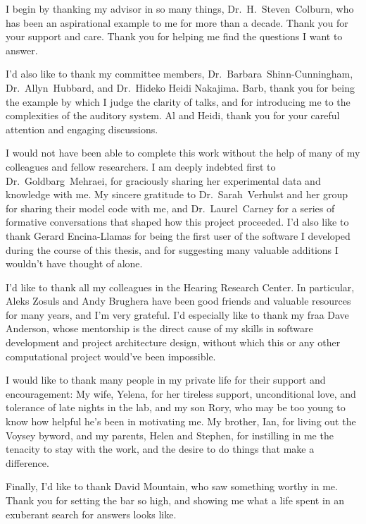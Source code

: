 
I begin by thanking my advisor in so many things, Dr.~H.~Steven~Colburn, who has been an aspirational example to me for more than a decade.  Thank you for  your support and care.  Thank you for helping me find the questions I want to answer.   

I'd also like to thank my committee members, Dr.~Barbara~Shinn-Cunningham, Dr.~Allyn~Hubbard, and Dr.~Hideko Heidi Nakajima.  Barb, thank you for being the example by which I judge the clarity of talks, and for introducing me to the complexities of the auditory system.  Al and Heidi, thank you for your careful attention and engaging discussions.

I would not have been able to complete this work without the help of many of my colleagues and fellow researchers.  I am deeply indebted first to Dr.~Goldbarg~Mehraei, for graciously sharing her experimental data and knowledge with me.  My sincere gratitude to Dr.~Sarah~Verhulst and her group for sharing their model code with me, and Dr.~Laurel~Carney for a series of formative conversations that shaped how this project proceeded.  I'd also like to thank Gerard Encina-Llamas for being the first user of the software I developed during the course of this thesis, and for suggesting many valuable additions I wouldn't have thought of alone.

I'd like to thank all my colleagues in the Hearing Research Center.  In particular, Aleks Zosuls and Andy Brughera have been good friends and valuable resources for many years, and I'm very grateful.  I'd especially like to thank my fraa Dave Anderson, whose mentorship is the direct cause of my skills in software development and project architecture design, without which this or any other computational project would've been impossible.  

I would like to thank many people in my private life for their support and encouragement:  My wife, Yelena, for her tireless support, unconditional love, and  tolerance of late nights in the lab, and my son Rory, who may be too young to know how helpful he's been in motivating me.  My brother, Ian, for living out the Voysey byword, and my parents, Helen and Stephen, for instilling in me the tenacity to stay with the work, and the desire to do things that make a difference.

Finally, I'd like to thank David Mountain, who saw something worthy in me. Thank you for setting the bar so high, and showing me what a life spent in an exuberant search for answers looks like. 